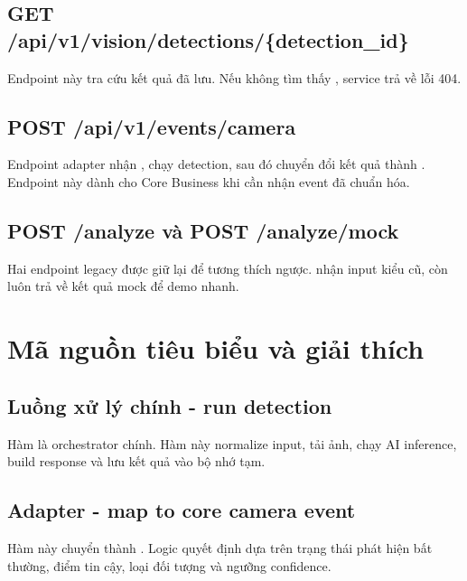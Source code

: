 \subsection{GET /api/v1/vision/detections/\{detection\_id\}}

Endpoint này tra cứu kết quả đã lưu. Nếu không tìm thấy , service trả về lỗi 404.

\subsection{POST /api/v1/events/camera}

Endpoint adapter nhận , chạy detection, sau đó chuyển đổi kết quả thành . Endpoint này dành cho Core Business khi cần nhận event đã chuẩn hóa.

\subsection{POST /analyze và POST /analyze/mock}

Hai endpoint legacy được giữ lại để tương thích ngược.  nhận input kiểu cũ, còn  luôn trả về kết quả mock để demo nhanh.

\section{Mã nguồn tiêu biểu và giải thích}

\subsection{Luồng xử lý chính - run detection}

Hàm  là orchestrator chính. Hàm này normalize input, tải ảnh, chạy AI inference, build response và lưu kết quả vào bộ nhớ tạm.

\subsection{Adapter - map to core camera event}

Hàm này chuyển  thành . Logic quyết định dựa trên trạng thái phát hiện bất thường, điểm tin cậy, loại đối tượng và ngưỡng confidence.

